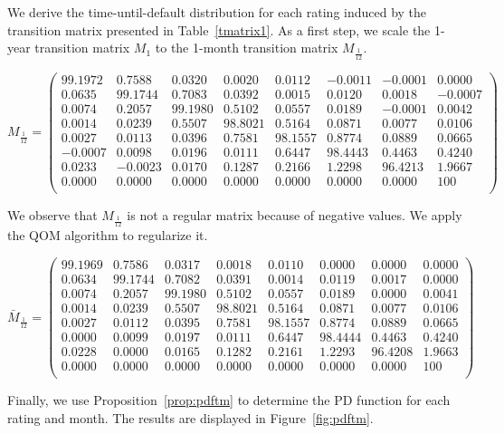 \documentclass[11pt,fleqn]{book} %
\begin{document}
\begin{example}
	\label{ex:pdftm}
	We derive the time-until-default distribution for each rating induced by the 
	transition matrix presented in Table~\ref{tmatrix1}. As a first step, we 
	scale the 1-year transition matrix $M_1$ to the 1-month transition matrix 
	$M_{\frac{1}{12}}$.
	{\small
	\begin{displaymath}
		M_{\frac{1}{12}} = \left(
		\begin{array}{cccccccc}
			99.1972 &  0.7588 &  0.0320 &  0.0020 &  0.0112 & -0.0011 & -0.0001 &   0.0000 \\
			 0.0635 & 99.1744 &  0.7083 &  0.0392 &  0.0015 &  0.0120 &  0.0018 &  -0.0007 \\
			 0.0074 &  0.2057 & 99.1980 &  0.5102 &  0.0557 &  0.0189 & -0.0001 &   0.0042 \\
			 0.0014 &  0.0239 &  0.5507 & 98.8021 &  0.5164 &  0.0871 &  0.0077 &   0.0106 \\
			 0.0027 &  0.0113 &  0.0396 &  0.7581 & 98.1557 &  0.8774 &  0.0889 &   0.0665 \\
			-0.0007 &  0.0098 &  0.0196 &  0.0111 &  0.6447 & 98.4443 &  0.4463 &   0.4240 \\
			 0.0233 & -0.0023 &  0.0170 &  0.1287 &  0.2166 &  1.2298 & 96.4213 &   1.9667 \\
			 0.0000 &  0.0000 &  0.0000 &  0.0000 &  0.0000 &  0.0000 &  0.0000 & 100 \\
		\end{array}
		\right)
	\end{displaymath}\par}
	We observe that $M_{\frac{1}{12}}$ is not a regular matrix because of 
	negative values. We apply the QOM algorithm to regularize it.
	{\small
	\begin{displaymath}
		\bar{M}_{\frac{1}{12}} = \left(
		\begin{array}{cccccccc}
			99.1969 &  0.7586 &  0.0317 &  0.0018 &  0.0110 &  0.0000 &  0.0000 &   0.0000 \\
			 0.0634 & 99.1744 &  0.7082 &  0.0391 &  0.0014 &  0.0119 &  0.0017 &   0.0000 \\
			 0.0074 &  0.2057 & 99.1980 &  0.5102 &  0.0557 &  0.0189 &  0.0000 &   0.0041 \\
			 0.0014 &  0.0239 &  0.5507 & 98.8021 &  0.5164 &  0.0871 &  0.0077 &   0.0106 \\
			 0.0027 &  0.0112 &  0.0395 &  0.7581 & 98.1557 &  0.8774 &  0.0889 &   0.0665 \\
			 0.0000 &  0.0099 &  0.0197 &  0.0111 &  0.6447 & 98.4444 &  0.4463 &   0.4240 \\
			 0.0228 &  0.0000 &  0.0165 &  0.1282 &  0.2161 &  1.2293 & 96.4208 &   1.9663 \\
			 0.0000 &  0.0000 &  0.0000 &  0.0000 &  0.0000 &  0.0000 &  0.0000 & 100 \\
		\end{array}
		\right)
	\end{displaymath}\par}
	Finally, we use Proposition~\ref{prop:pdftm} to determine the 
	PD function for each rating and month. The results are displayed in 
	Figure~\ref{fig:pdftm}.
\end{example}
\end{document}
